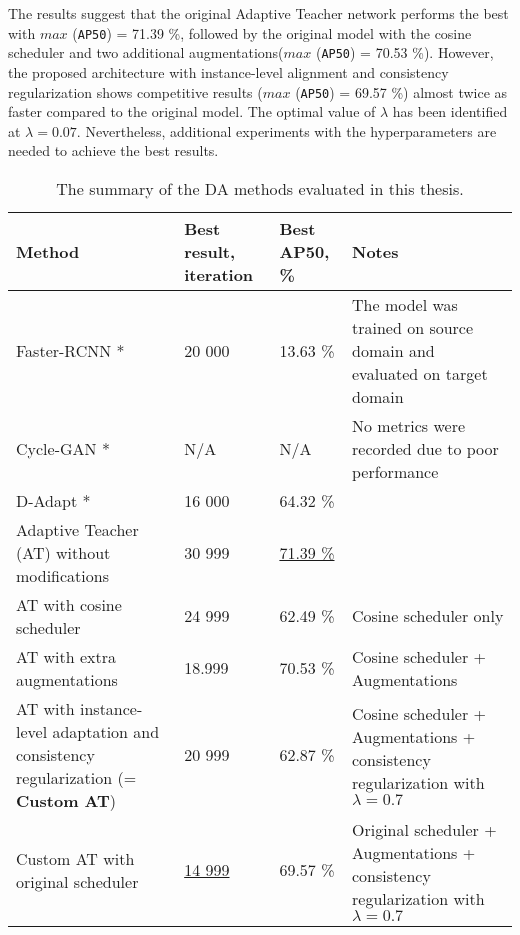 The results suggest that the original Adaptive Teacher network performs the best with $max$ (\texttt{AP50}) = 71.39 \%, followed by the original model with the cosine scheduler and two additional augmentations($max$ (\texttt{AP50}) = 70.53 \%).  However, the proposed architecture with instance-level alignment and consistency regularization shows competitive results ($max$ (\texttt{AP50}) = 69.57 \%) almost twice as faster compared to the original model. The optimal value of $\lambda$ has been identified at  $\lambda = 0.07$. Nevertheless, additional experiments with the hyperparameters are needed to achieve the best  results. 

\begin{table}
\centering
\caption{The summary of the DA methods evaluated in this thesis.}\label{summary_table_1} 
\begin{tabularx}{0.95\textwidth}{|X|X|X|X|} 
        \hline
        \textbf{Method} & \textbf{Best result, iteration} & \textbf{Best AP50, \%} & \textbf{Notes} \\
        \hline
        Faster-RCNN \cite{ima} * & 20 000 & 13.63 \% & \multicolumn{1}{m{3cm}|}{The model was trained on source domain and evaluated on target domain} \\ 
        \hline
        Cycle-GAN \cite{Zhu2017} * & N/A & N/A & \multicolumn{1}{m{3cm}|}{No metrics were recorded due to poor performance}\\ 
        \hline
        D-Adapt \cite{Jiang2021} * & 16 000 & 64.32 \% & \multicolumn{1}{m{3cm}|}{} \\ 
        \hline
        Adaptive Teacher (AT) \cite{Li2021} without modifications & 30 999 & \uline{71.39 \%} & \multicolumn{1}{m{3cm}|}{} \\ 
        \hline
        AT with cosine scheduler & 24 999 & 62.49 \% & \multicolumn{1}{m{3cm}|}{Cosine scheduler only} \\ 
        \hline
        AT with extra augmentations & 18.999 & 70.53 \% & \multicolumn{1}{m{3cm}|}{Cosine scheduler + Augmentations} \\ 
        \hline
        AT with instance-level adaptation and consistency regularization (= \textbf{Custom AT}) & 20 999 & 62.87 \% & \multicolumn{1}{m{3cm}|}{Cosine scheduler + Augmentations + consistency regularization with $\lambda = 0.7$}  \\ 
        \hline
        Custom AT with original scheduler & \uline{14 999} & 69.57 \% & \multicolumn{1}{m{3cm}|}{Original scheduler + Augmentations + consistency regularization with $\lambda = 0.7$ } \\ 

\end{tabularx}
\end{table}
